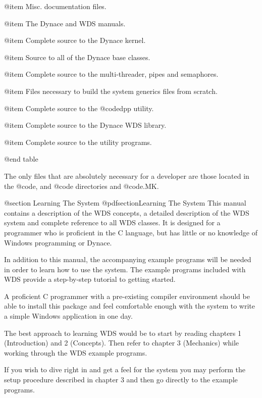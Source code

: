 @item \DYNACE\DOCS
Misc. documentation files.

@item \DYNACE\MANUAL
The Dynace and WDS manuals.

@item \DYNACE\KERNAL
Complete source to the Dynace kernel.

@item \DYNACE\CLASS
Source to all of the Dynace base classes.

@item \DYNACE\THREADS
Complete source to the multi-threader, pipes and semaphores.

@item \DYNACE\GENERICS
Files necessary to build the system generics files from scratch.

@item \DYNACE\DPP
Complete source to the @code{dpp} utility.

@item \DYNACE\WINDOWS
Complete source to the Dynace WDS library.

@item \DYNACE\UTILS
Complete source to the utility programs.

@end table



The only files that are absolutely necessary for a developer are those
located in the @code{\DYNACE\LIB, \DYNACE\INCLUDE} and @code{\DYNACE\BIN}
directories and @code{\DYNACE\UTILS\STARTUP.MK}.





@section Learning The System
@pdfsection{Learning The System}
This manual contains a description of the WDS concepts, a detailed
description of the WDS system and complete reference to all WDS classes.
It is designed for a programmer who is proficient in the C language, but
has little or no knowledge of Windows programming or Dynace.


In addition to this manual, the accompanying example programs will be
needed in order to learn how to use the system.  The example programs
included with WDS provide a step-by-step tutorial to getting started.


A proficient C programmer with a pre-existing compiler environment
should be able to install this package and feel comfortable enough with
the system to write a simple Windows application in one day.


The best approach to learning WDS would be to start by reading chapters
1 (Introduction) and 2 (Concepts).  Then refer to chapter 3 (Mechanics)
while working through the WDS example programs.

If you wish to dive right in and get a feel for the system you may
perform the setup procedure described in chapter 3 and then go directly
to the example programs.

